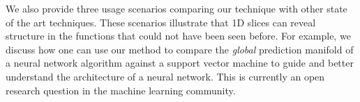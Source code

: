 We also provide three usage scenarios comparing our technique with other state of the art techniques. These scenarios illustrate that 1D
slices can reveal structure in the functions that could not
have been seen before. For example, we discuss how one can use our
method to compare the \emph{global} prediction manifold of a neural
network algorithm against a support vector machine to guide and better understand the architecture of a neural network. This is currently an open research question in the machine learning community.

